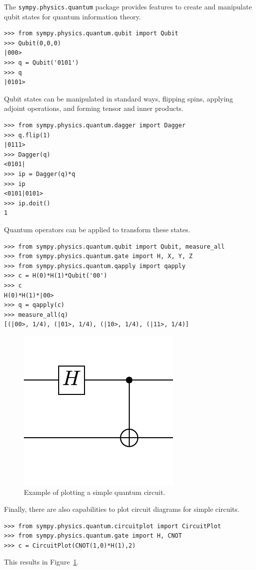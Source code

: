 The \verb|sympy.physics.quantum| package provides features to create and manipulate qubit states for quantum information theory.
\begin{verbatim}
>>> from sympy.physics.quantum.qubit import Qubit
>>> Qubit(0,0,0)
|000>
>>> q = Qubit('0101')
>>> q
|0101>
\end{verbatim}
Qubit states can be manipulated in standard ways, flipping spins, applying adjoint operations, and forming tensor and inner products.
\begin{verbatim}
>>> from sympy.physics.quantum.dagger import Dagger
>>> q.flip(1)
|0111>
>>> Dagger(q)
<0101|
>>> ip = Dagger(q)*q
>>> ip
<0101|0101>
>>> ip.doit()
1
\end{verbatim}
Quantum operators can be applied to transform these states.
\begin{verbatim}
>>> from sympy.physics.quantum.qubit import Qubit, measure_all
>>> from sympy.physics.quantum.gate import H, X, Y, Z
>>> from sympy.physics.quantum.qapply import qapply
>>> c = H(0)*H(1)*Qubit('00')
>>> c
H(0)*H(1)*|00>
>>> q = qapply(c)
>>> measure_all(q)
[(|00>, 1/4), (|01>, 1/4), (|10>, 1/4), (|11>, 1/4)]
\end{verbatim}

\begin{figure}[htbp]
\begin{center}
\includegraphics[scale=0.75]{images/circuitplot-example}
\caption{Example of plotting a simple quantum circuit.}
\label{fig-circuitplot-example}
\end{center}
\end{figure}

Finally, there are also capabilities to plot circuit diagrams for simple circuits.
\begin{verbatim}
>>> from sympy.physics.quantum.circuitplot import CircuitPlot
>>> from sympy.physics.quantum.gate import H, CNOT
>>> c = CircuitPlot(CNOT(1,0)*H(1),2)
\end{verbatim}
This results in Figure~\ref{fig-circuitplot-example}.
